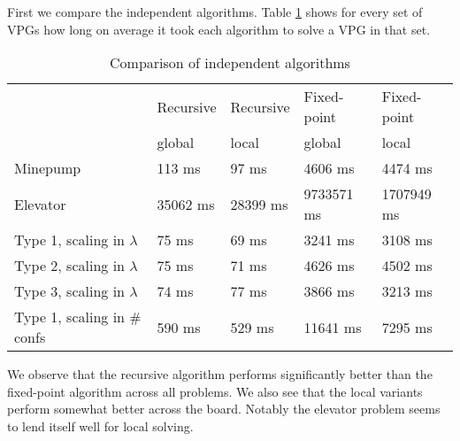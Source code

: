First we compare the independent algorithms. Table \ref{tab_compare_independent_algs} shows for every set of VPGs how long on average it took each algorithm to solve a VPG in that set.
\begin{table}[h]
	\centering
	\begin{tabular}{|l|l|l|l|l|}
		\hline
		& Recursive &Recursive & Fixed-point & Fixed-point\\
		& global & local & global & local \\
		\hline
		Minepump& 113 ms& 97 ms& 4606 ms& 4474 ms\\ \hline
		Elevator& 35062 ms& 28399 ms& 9733571 ms& 1707949 ms\\ \hline
		Type 1, scaling in $\lambda$& 75 ms& 69 ms& 3241 ms& 3108 ms\\ \hline
		Type 2, scaling in $\lambda$& 75 ms& 71 ms& 4626 ms& 4502 ms\\ \hline
		Type 3, scaling in $\lambda$& 74 ms& 77 ms& 3866 ms& 3213 ms\\ \hline
		Type 1, scaling in \# confs& 590 ms& 529 ms& 11641 ms& 7295 ms\\ \hline
	\end{tabular}
	\caption{Comparison of independent algorithms}
	\label{tab_compare_independent_algs}
\end{table}
We observe that the recursive algorithm performs significantly better than the fixed-point algorithm across all problems. We also see that the local variants perform somewhat better across the board. Notably the elevator problem seems to lend itself well for local solving.

